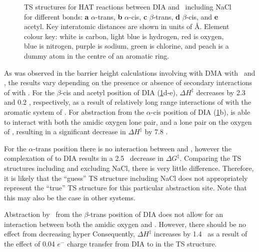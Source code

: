 \begin{figure}\ContinuedFloat

  \caption[TS structures for HAT reaction between DIA and \cumo\ including
  NaCl.]{TS structures for HAT reactions between DIA and \cumo\ including NaCl
  for different  bonds: \textbf{a} $\alpha$-trans, \textbf{b}
  $\alpha$-cis, \textbf{c} $\beta$-trans, \textbf{d} $\beta$-cis, and
  \textbf{e} acetyl. Key interatomic distances are shown in units of \AA.
  Element colour key: white is carbon, light blue is hydrogen, red is oxygen,
  blue is nitrogen, purple is sodium, green is chlorine, and peach is a dummy
  atom in the centre of an aromatic ring.} \label{fig:dia-cumo-ts}
\end{figure}

As was observed in the barrier height calculations involving  with DMA
with \bno\ and \cumo, the results vary depending on the presence or absence of
secondary interactions of  with \cumo. For the $\beta$-cis and acetyl
position of DIA (\ref{fig:dia-cumo-ts}d-e), $\Delta H^\ddagger$ decreases by
2.3 and 0.2 \kcalmol, respectively, as a result of relatively long range
interactions of  with the aromatic system of \cumo. For abstraction
from the $\alpha$-cis position of DIA (\ref{fig:dia-cumo-ts}b),  is
able to interact with both the amidic oxygen lone pair, and a lone pair on the
oxygen of \cumo, resulting in a significant decrease in $\Delta H^\ddagger$ by
7.8 \kcalmol.

For the $\alpha$-trans position there is no interaction between  and
\cumo, however the complexation of  to DIA results in a 2.5 \kcalmol\
decrease in $\Delta G^\ddagger$. Comparing the TS structures including and
excluding NaCl, there is very little difference. Therefore, it is likely that
the ``guess'' TS structure including NaCl does not appropriately represent the
``true'' TS structure for this particular abstraction site. Note that this may
also be the case in other systems.

Abstraction by \cumo\ from the $\beta$-trans position of DIA does not allow for
an interaction between both the amidic oxygen and \cumo. However, there should
be no effect from decreasing hyper Consequently, $\Delta H^\ddagger$ increases
by 1.4 \kcalmol\ as a result of the effect of 0.04 $e^-$ charge transfer from
DIA to \ch{Na^+} in the TS structure.



